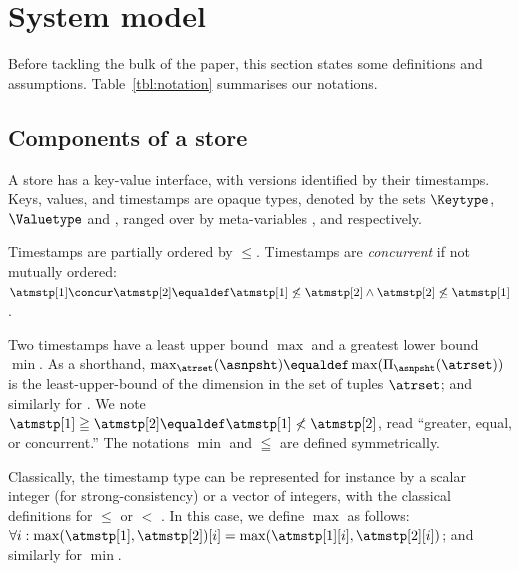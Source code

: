 
\section{System model}
\label{sec:system-model}



Before tackling the bulk of the paper, this section states some
definitions and assumptions.
Table~\ref{tbl:notation} summarises our notations.

\subsection{Components of a store}

A store has a key-value interface, with versions identified by their
timestamps.
Keys, values, and timestamps are opaque types, denoted by the sets
$\Keytype$, $\Valuetype$ and \Timestamptype, ranged over by
meta-variables \akey, \aval and \atmstp{} respectively.

Timestamps are partially ordered by $\le$.
Timestamps are \emph{concurrent} if not mutually ordered:
$\atmstp[1] \concur \atmstp[2] \equaldef \atmstp[1] \not\le
\atmstp[2] \land \atmstp[2] \not\le \atmstp[1]$.

Two timestamps have a least upper bound $\max$ and a greatest lower
bound $\min$.
As a shorthand, $\max_{\atrset}(\asnpsht) \equaldef \max(
\Pi_{\asnpsht}(\atrset) )$ is the least-upper-bound of the \asnpsht{}
dimension in the set of tuples $\atrset$; and similarly for \acomstp{}.
We note $\atmstp[1] \geqq \atmstp[2] \equaldef \atmstp[1] \not<
\atmstp[2]$, read ``greater, equal, or concurrent.''
The notations $\min$ and $\leqq$ are defined symmetrically.

Classically, the timestamp type can be represented for instance by a
scalar integer (for strong-consistency) or a vector of integers, with
the classical definitions for $\le$ or $<$ \cite{alg:rep:738,
  alg:rep:738bis}.
In this case, we define $\max$ as follows:
  $\forall i: \max(\atmstp[1],\atmstp[2])[i] =
  \max(\atmstp[1][i],\atmstp[2][i])$; and similarly for $\min$.

